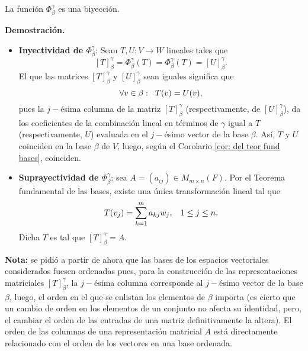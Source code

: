 \begin{prop}
	La función $\Phi_{\beta}^{\gamma}$ es una biyección.
\end{prop}
\noindent
\textbf{Demostración.}
\begin{itemize}
	\item \textbf{Inyectividad de $\Phi_{\beta}^{\gamma}$}:
	Sean $T, U : V \longrightarrow W$ lineales tales que 
	\[
	[T]_{\beta}^{\gamma} = \Phi_{\beta}^{\gamma}(T)
	= \Phi_{\beta}^{\gamma}(T) = [U]_{\beta}^{\gamma}.
	\]
	El que las matrices $[T]_{\beta}^{\gamma}$ y 
	$[U]_{\beta}^{\gamma}$ sean iguales significa que 
	\[
	\forall v \in \beta : \hspace{0.2cm} T(v) = U(v),
	\]
	pues la $j-$ésima columna de la matriz
	$[T]_{\beta}^{\gamma}$ (respectivamente, de 
	$[U]_{\beta}^{\gamma}$), 
	da los coeficientes 
	de la combinación lineal en términos de $\gamma$ igual a $T$ 
	(respectivamente, $U$)
	evaluada en el
	$j-$ésimo vector de la base $\beta$. Así, $T$ y $U$ coinciden en la 
	base $\beta$ de $V$, luego, según el Corolario 
	\ref{cor: del teor fund bases}, coinciden.
	\item \textbf{Suprayectividad de $\Phi_{\beta}^{\gamma}$}:
	sea $A = (a_{ij}) \in M_{m \times n}(F)$. Por el Teorema fundamental 
	de las bases, 
	existe una única
	transformación lineal tal que 
	\[
	T(v_{j}) = \sum_{k = 1}^{m} a_{kj} w_{j}, \hspace{0.3cm}
	1 \leq j \leq n.
	\]
	Dicha $T$ es tal que $[T]_{\beta}^{\gamma} = A$.
\end{itemize}

\QEDB
\vspace{0.2cm}




\textbf{Nota:} se pidió a partir de ahora que las bases de los
espacios vectoriales considerados fuesen ordenadas pues,
para la construcción de las representaciones matriciales 
$[T]_{\beta}^{\gamma}$, la $j-$ésima columna corresponde al
$j-$ésimo vector de la base $\beta$, luego, el orden en el que se
enlistan los elementos de $\beta$ importa (es cierto que un cambio
de orden en los elementos de un conjunto no afecta su identidad,
pero, el cambiar el orden de las entradas de una matriz 
definitivamente la 
altera).
El orden de las columnas de una representación matricial 
$A$ está directamente relacionado con el orden de los vectores en 
una base ordenada.


